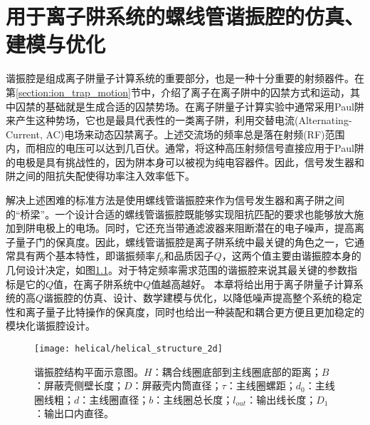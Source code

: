 
\chapter[用于离子阱系统的高Q螺线管谐振腔的仿真、建模与优化]{用于离子阱系统的螺线管谐振腔的仿真、建模与优化\label{section:helical}}
谐振腔是组成离子阱量子计算系统的重要部分，也是一种十分重要的射频器件。在第\ref{section:ion_trap_motion}节中，介绍了离子在离子阱中的囚禁方式和运动，其中囚禁的基础就是生成合适的囚禁势场。在离子阱量子计算实验中通常采用Paul阱来产生这种势场，它也是最具代表性的一类离子阱，利用交替电流(Alternating-Current, AC)电场来动态囚禁离子。上述交流场的频率总是落在射频(RF)范围内，而相应的电压可以达到几百伏。通常，将这种高压射频信号直接应用于Paul阱的电极是具有挑战性的，因为阱本身可以被视为纯电容器件。因此，信号发生器和阱之间的阻抗失配使得功率注入效率低下。

解决上述困难的标准方法是使用螺线管谐振腔来作为信号发生器和离子阱之间的“桥梁”。一个设计合适的螺线管谐振腔既能够实现阻抗匹配的要求也能够放大施加到阱电极上的电场。同时，它还充当带通滤波器来阻断潜在的电子噪声，提高离子量子门的保真度。因此，螺线管谐振腔是离子阱系统中最关键的角色之一，它通常具有两个基本特性，即谐振频率$f_0$和品质因子$Q$，这两个值主要由谐振腔本身的几何设计决定，如图\ref{fig:helical_structure_2d}。对于特定频率需求范围的谐振腔来说其最关键的参数指标是它的$Q$值，在离子阱系统中$Q$值越高越好。
本章将给出用于离子阱量子计算系统的高$Q$谐振腔的仿真、设计、数学建模与优化，以降低噪声提高整个系统的稳定性和离子量子比特操作的保真度\cite[]{van_Dijk_Kawakami_Schouten_Veldhorst_Vandersypen_Babaie_Charbon_Sebastiano_2019}，同时也给出一种装配和耦合更方便且更加稳定的模块化谐振腔设计。

\begin{figure}
    \centering
    \texttt{[image: helical/helical\_structure\_2d]}
    \caption[谐振腔结构平面示意图]{谐振腔结构平面示意图。$H$：耦合线圈底部到主线圈底部的距离；$B$：屏蔽壳侧壁长度；$D$：屏蔽壳内筒直径；$\tau$：主线圈螺距；$d_0$：主线圈线粗；$d$：主线圈直径；$b$：主线圈总长度；$l_{out}$：输出线长度；$D_1$：输出口内直径。\label{fig:helical_structure_2d}}
\end{figure}


